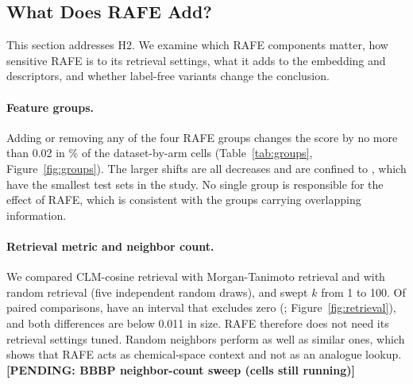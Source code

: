 \documentclass[pdflatex,sn-mathphys-num]{sn-jnl}%
\newcommand{\pending}[1]{{\color{red}\textbf{[PENDING: #1]}}}%
\begin{document}
\begin{table}[!ht]
\centering
\caption{Fingerprint and descriptor baselines (best tree per cell; MCC for classification, Spearman for regression). Three seeds on the smaller datasets and one on hERG and Flavor.}
\label{tab:fingerprints}
\scriptsize
{}
\end{table}

\subsection{What Does RAFE Add?}\label{sec:rafe_effectiveness}
This section addresses H2. We examine which RAFE components matter, how sensitive RAFE is to its retrieval settings, what it adds to the embedding and descriptors, and whether label-free variants change the conclusion.

\paragraph{Feature groups.} Adding or removing any of the four RAFE groups changes the score by no more than 0.02 in \fracsmall\% of the \ncellsabl{} dataset-by-arm cells (Table~\ref{tab:groups}, Figure~\ref{fig:groups}). The \nbig{} larger shifts are all decreases and are confined to \bigcfg{}, which have the smallest test sets in the study. No single group is responsible for the effect of RAFE, which is consistent with the groups carrying overlapping information.

\paragraph{Retrieval metric and neighbor count.} We compared CLM-cosine retrieval with Morgan-Tanimoto retrieval and with random retrieval (five independent random draws), and swept $k$ from 1 to 100. Of \nkcomp{} paired comparisons, \nkexc{} have an interval that excludes zero (\excdetails; Figure~\ref{fig:retrieval}), and both differences are below 0.011 in size. RAFE therefore does not need its retrieval settings tuned. Random neighbors perform as well as similar ones, which shows that RAFE acts as chemical-space context and not as an analogue lookup. \pending{BBBP neighbor-count sweep (cells still running)}
\end{document}
